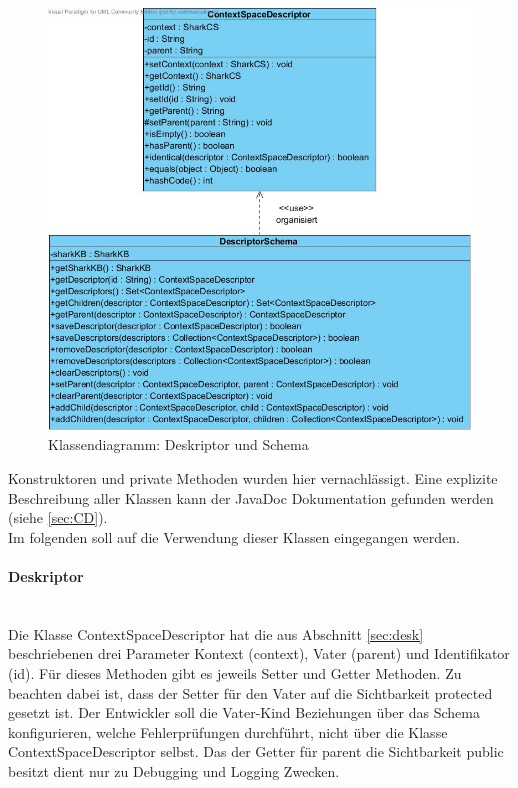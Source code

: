 \documentclass[a4paper]{article}
\begin{document}
	\begin{figure}[H]
		\centerline{
			\includegraphics[scale=0.53]{../Bilder/impl_schema.jpg}
		}
		\caption{Klassendiagramm: Deskriptor und Schema}
		\label{fig:impl_schema}
	\end{figure}	
	
	Konstruktoren und private Methoden wurden hier vernachlässigt. Eine
	explizite Beschreibung aller Klassen kann der JavaDoc Dokumentation gefunden
	werden (siehe \autoref{sec:CD}). \\
	
	Im folgenden soll auf die Verwendung dieser Klassen eingegangen werden.
		
	\paragraph{Deskriptor}\mbox{} \\
	
	Die Klasse ContextSpaceDescriptor hat die aus Abschnitt \ref{sec:desk} 
	beschriebenen drei Parameter Kontext (context), Vater (parent) und
	Identifikator (id). Für dieses Methoden gibt es jeweils Setter und Getter
	Methoden. Zu beachten dabei ist, dass der Setter für den Vater auf die
	Sichtbarkeit protected gesetzt ist. Der Entwickler soll die	Vater-Kind
	Beziehungen über das Schema konfigurieren, welche Fehlerprüfungen durchführt,
	nicht über die Klasse ContextSpaceDescriptor selbst. Das der Getter für
	parent die Sichtbarkeit public besitzt dient nur zu Debugging und Logging
	Zwecken.\\
	
\end{document}
